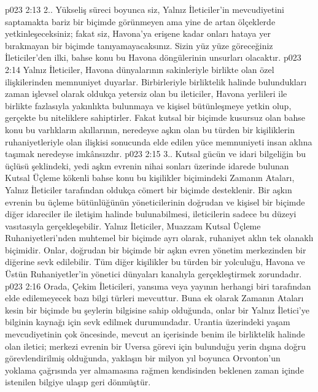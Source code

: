 \vs p023 2:13 2.\bibnobreakspace {}. Yükseliş süreci boyunca siz, Yalnız İleticiler’in mevcudiyetini saptamakta bariz bir biçimde görünmeyen ama yine de artan ölçeklerde yetkinleşeceksiniz; fakat siz, Havona’ya erişene kadar onları hataya yer bırakmayan bir biçimde tanıyamayacaksınız. Sizin yüz yüze göreceğiniz İleticiler’den ilki, bahse konu bu Havona döngülerinin unsurları olacaktır.
\vs p023 2:14 Yalnız İleticiler, Havona dünyalarının sakinleriyle birlikte olan özel ilişkilerinden memnuniyet duyarlar. Birbirleriyle birliktelik halinde bulundukları zaman işlevsel olarak oldukça yetersiz olan bu ileticiler, Havona yerlileri ile birlikte fazlasıyla yakınlıkta bulunmaya ve kişisel bütünleşmeye yetkin olup, gerçekte bu niteliklere sahiptirler. Fakat kutsal bir biçimde kusursuz olan bahse konu bu varlıkların akıllarının, neredeyse aşkın olan bu türden bir kişiliklerin ruhaniyetleriyle olan ilişkisi sonucunda elde edilen yüce memnuniyeti insan aklına taşımak neredeyse imkânsızdır.
\vs p023 2:15 3.\bibnobreakspace {}. Kutsal gücün ve idari bilgeliğin bu üçlüsü şeklindeki, yedi aşkın evrenin nihai sonları üzerinde idarede bulunan Kutsal Üçleme kökenli bahse konu bu kişilikler biçimindeki Zamanın Ataları, Yalnız İleticiler tarafından oldukça cömert bir biçimde desteklenir. Bir aşkın evrenin bu üçleme bütünlüğünün yöneticilerinin doğrudan ve kişisel bir biçimde diğer idareciler ile iletişim halinde bulunabilmesi, ileticilerin sadece bu düzeyi vasıtasıyla gerçekleşebilir. Yalnız İleticiler, Muazzam Kutsal Üçleme Ruhaniyetleri’nden muhtemel bir biçimde ayrı olarak, ruhaniyet aklın tek olanaklı biçimidir. Onlar, doğrudan bir biçimde bir aşkın evren yönetim merkezinden bir diğerine sevk edilebilir. Tüm diğer kişilikler bu türden bir yolculuğu, Havona ve Üstün Ruhaniyetler’in yönetici dünyaları kanalıyla gerçekleştirmek zorundadır.
\vs p023 2:16 Orada, Çekim İleticileri, yansıma veya yayının herhangi biri tarafından elde edilemeyecek bazı bilgi türleri mevcuttur. Buna ek olarak Zamanın Ataları kesin bir biçimde bu şeylerin bilgisine sahip olduğunda, onlar bir Yalnız İletici’ye bilginin kaynağı için sevk edilmek durumundadır. Urantia üzerindeki yaşam mevcudiyetinin çok öncesinde, mevcut an içerisinde benim ile birliktelik halinde olan iletici; merkezi evrenin bir Uversa görevi için bulunduğu yerin dışına doğru görevlendirilmiş olduğunda, yaklaşın bir milyon yıl boyunca Orvonton’un yoklama çağrısında yer almamasına rağmen kendisinden beklenen zaman içinde istenilen bilgiye ulaşıp geri dönmüştür.
